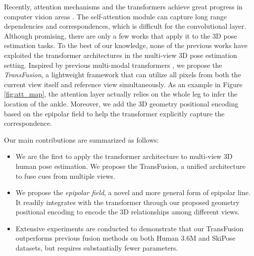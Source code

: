 \documentclass{bmvc2k}
\begin{document}
Recently, attention mechanisms and the transformers \cite{vaswani2017attention} achieve great progress in computer vision areas \cite{wang2018non, dosovitskiy2020image, carion2020end, zhu2020deformable, zheng2020rethinking, lin2020end, tang2021spatial, wang2022sscap}.
The self-attention module \cite{vaswani2017attention} can capture long range dependencies and correspondences, which is difficult for the convolutional layer. Although promising, there are only a few works \cite{lin2020end} that apply it to the 3D pose estimation tasks. To the best of our knowledge, none of the previous works have exploited the transformer architectures in the multi-view 3D pose estimation setting. Inspired by previous multi-modal transformers \cite{su2019vl, tan2019lxmert, kim2021vilt}, we propose the \textit{TransFusion}, a lightweight framework that can utilize all pixels from both the current view itself and reference view simultaneously. As an example in Figure \ref{fig:att_map}, the attention layer actually relies on the whole leg to infer the location of the ankle. Moreover, we add the 3D geometry positional encoding based on the epipolar field to help the transformer explicitly capture the correspondence. 




Our main contributions are summarized as follows:
\vspace{-0.5em}
\begin{itemize}
    \item We are the first to apply the transformer architecture to multi-view 3D human pose estimation. We propose the TransFusion, a unified architecture to fuse cues from multiple views. 
    
    \vspace{-0.5em}
    \item We propose the \textit{epipolar field}, a novel and more general form of epipolar line. It readily integrates with the transformer through our proposed geometry positional encoding to encode the 3D relationships among different views.  
    
    \vspace{-0.5em}
    \item Extensive experiments are conducted to demonstrate that our TransFusion  outperforms previous fusion methods on both Human 3.6M and SkiPose datasets, but requires substantially fewer parameters.
    \vspace{-0.5em}
\end{itemize}
\end{document}
